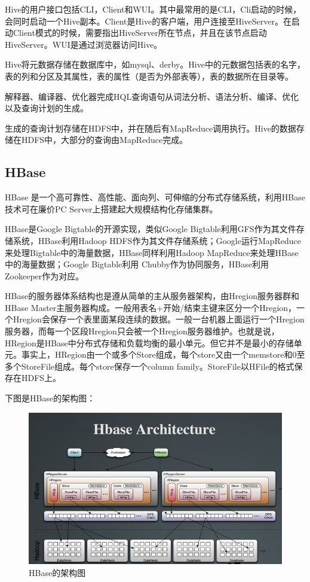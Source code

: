   Hive的用户接口包括CLI，Client和WUI。其中最常用的是CLI，Cli启动的时候，会同时启动一个Hive副本。Client是Hive的客户端，用户连接至HiveServer。在启动Client模式的时候，需要指出HiveServer所在节点，并且在该节点启动HiveServer。WUI是通过浏览器访问Hive。


  Hive将元数据存储在数据库中，如mysql、derby。Hive中的元数据包括表的名字，表的列和分区及其属性，表的属性（是否为外部表等），表的数据所在目录等。


  解释器、编译器、优化器完成HQL查询语句从词法分析、语法分析、编译、优化以及查询计划的生成。


生成的查询计划存储在HDFS中，并在随后有MapReduce调用执行。Hive的数据存储在HDFS中，大部分的查询由MapReduce完成。

\subsection{HBase}
  HBase 是一个高可靠性、高性能、面向列、可伸缩的分布式存储系统，利用HBase技术可在廉价PC Server上搭建起大规模结构化存储集群。


  HBase是Google Bigtable的开源实现，类似Google Bigtable利用GFS作为其文件存储系统，HBase利用Hadoop HDFS作为其文件存储系统；Google运行MapReduce来处理Bigtable中的海量数据，HBase同样利用Hadoop MapReduce来处理HBase中的海量数据；Google Bigtable利用 Chubby作为协同服务，HBase利用Zookeeper作为对应。

 
 HBase的服务器体系结构也是遵从简单的主从服务器架构，由Hregion服务器群和HBase Master主服务器构成。一般用表名+开始/结束主键来区分一个Hregion，一个Hregion会保存一个表里面某段连续的数据。一般一台机器上面运行一个Hregion服务器，而每一个区段Hregion只会被一个Hregion服务器维护。也就是说，HRegion是HBase中分布式存储和负载均衡的最小单元。但它并不是最小的存储单元。事实上，HRegion由一个或多个Store组成，每个store又由一个memstore和0至多个StoreFile组成。每个store保存一个column family。StoreFile以HFile的格式保存在HDFS上。


  下图是HBase的架构图： 
\clearpage

\begin{figure}[!ht]
\centering
\includegraphics[scale=0.5]{photo/hbase.JPG}
\caption{HBase的架构图}
\end{figure}


